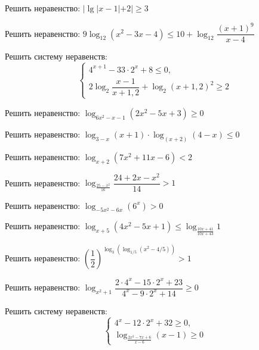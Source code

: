 %
%

\begin{class}[number=1]
	\begin{listofex}
		\item Решить неравенство: 
		\( |\lg|x-1|+2|\ge3 \)
		\item Решить неравенство: 
		\( 9\log_{12}(x^2-3x-4)\le10+\log_{12}\dfrac{(x+1)^9}{x-4} \)
		\item Решить систему неравенств: 
		\[ \left\{
		\begin{array}{l}
			4^{x+1}-33\cdot2^x+8\le0, \\
			2\log_2\dfrac{x-1}{x+1,2}+\log_2(x+1,2)^2\ge2
		\end{array}
		\right. \]
		\item Решить неравенство: 
		\( \log_{6x^2-x-1}(2x^2-5x+3)\ge0 \)
		\item Решить неравенство: 
		\( \log_{3-x}(x+1)\cdot\log_(x+2)(4-x)\le0 \)
		\item Решить неравенство: 
		\( \log_{x+2}(7x^2+11x-6)<2 \)
		\item Решить неравенство: 
		\( \log_{\frac{25-x^2}{16}}{\dfrac{24+2x-x^2}{14}}>1 \)
		\item Решить неравенство: 
		\( \log_{-5x^2-6x}(6^x)>0 \)
		\item Решить неравенство: 
		\( \log_{x+5}(4x^2-5x+1)\le\log_{\frac{10x+41}{10x+43}}1 \)
		\item Решить неравенство: 
		\( \left( \dfrac{1}{2} \right)^{\log_3(\log_{1/5}(x^2-4/5))}>1 \)
		\item Решить неравенство: 
		\( \log_{x^2+1}\dfrac{2\cdot4^x-15\cdot2^x+23}{4^x-9\cdot2^x+14}\ge0 \)
		\item Решить систему неравенств: 
		\[ \left\{
		\begin{array}{l}
			4^x-12\cdot2^x+32\ge0, \\
			\log_{\frac{2x^2-7x+6}{x-6}}(x-1)\ge0
		\end{array}
		\right. \]
	\end{listofex}
\end{class}

